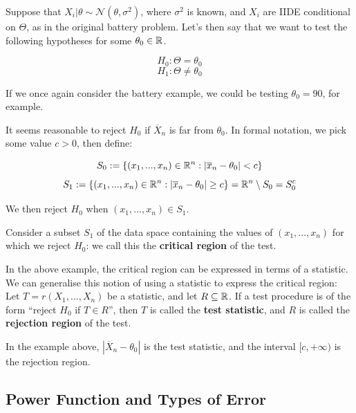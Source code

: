\documentclass[a4paper]{article}
\begin{document}
            Suppose that $X_i | \theta \sim \mathcal{N}(\theta, \sigma^2)$,
            where $\sigma^2$ is known, and $X_i$ are IIDE conditional on
            $\Theta$, as in the original battery problem. Let's then say that we
            want to test the following hypotheses for some $\theta_0 \in \mathbb{R}$.

            \[
                H_0: \Theta = \theta_0
            \]
            \[
                H_1: \Theta \neq \theta_0
            \]

            If we once again consider the battery example, we could be testing
            $\theta_0 = 90$, for example.

            It seems reasonable to reject $H_0$ if $\overline X_n$ is far from
            $\theta_0$. In formal notation, we pick some value $c > 0$, then
            define:

            \[
                S_0 := \{(x_1, ..., x_n) \in \mathbb{R}^n: |\overline x_n - \theta_0| <
                c\}
            \]
            \[
                S_1 := \{(x_1, ..., x_n) \in \mathbb{R}^n: |\overline x_n - \theta_0|
                \geq c\} = \mathbb{R}^n \setminus S_0 = S_0^c
            \]

            We then reject $H_0$ when $(x_1, ..., x_n) \in S_1$.

            \begin{definition}
                Consider a subset $S_1$ of the data space containing the values
                of $(x_1, ..., x_n)$ for which we reject $H_0$: we call this the
                \textbf{critical region} of the test.

                In the above example, the critical region can be expressed in
                terms of a statistic. We can generalise this notion of using a
                statistic to express the critical region: Let $T = r(X_1, ...,
                X_n)$ be a statistic, and let $R \subseteq \mathbb{R}$. If a test
                procedure is of the form ``reject $H_0$ if $T \in R$'', then $T$
                is called the \textbf{test statistic}, and $R$ is called the
                \textbf{rejection region} of the test.

                In the example above, $|\overline X_n - \theta_0|$ is the test
                statistic, and the interval $[c, +\infty)$ is the rejection
                region.
            \end{definition}

        \subsection{Power Function and Types of Error}
            \begin{fread}
                [DS12, section 9.1]
            \end{fread}
\end{document}
